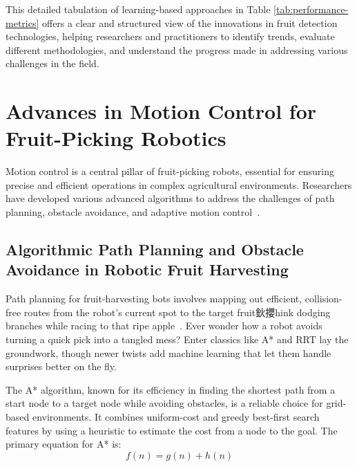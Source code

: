 \documentclass[a4paper,fleqn]{cas-dc}
\begin{document}
This detailed tabulation of learning-based approaches in Table \ref{tab:performance-metrics} offers a clear and structured view of the innovations in fruit detection technologies, helping researchers and practitioners to identify trends, evaluate different methodologies, and understand the progress made in addressing various challenges in the field.

\section{Advances in Motion Control for Fruit-Picking Robotics}
Motion control is a central pillar of fruit-picking robots, essential for ensuring precise and efficient operations in complex agricultural environments. Researchers have developed various advanced algorithms to address the challenges of path planning, obstacle avoidance, and adaptive motion control~\cite{Ahmad:2023_bnb, Loganathan:2024_hho_avoa, Teo:2020, Arrouch:2022b, 10746490}.

\subsection{Algorithmic Path Planning and Obstacle Avoidance in Robotic Fruit Harvesting}
Path planning for fruit-harvesting bots involves mapping out efficient, collision-free routes from the robot's current spot to the target fruit鈥攖hink dodging branches while racing to that ripe apple~\cite {Leong:2024_review}. Ever wonder how a robot avoids turning a quick pick into a tangled mess? Enter classics like A* and RRT lay the groundwork, though newer twists add machine learning that let them handle surprises better on the fly.

The A* algorithm, known for its efficiency in finding the shortest path from a start node to a target node while avoiding obstacles, is a reliable choice for grid-based environments. It combines uniform-cost and greedy best-first search features by using a heuristic to estimate the cost from a node to the goal. The primary equation for A* is:
\begin{equation}
f(n) = g(n) + h(n)
\label{eq:astar}
\end{equation}
\end{document}
